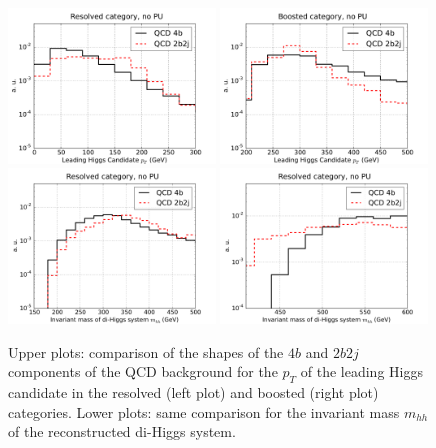 \begin{figure}[t]
\begin{center}
 \includegraphics[width=0.49\textwidth]{plots/pt_h0_C2_res_back_noPU.pdf}
 \includegraphics[width=0.49\textwidth]{plots/pt_h0_C2_bst_back_noPU.pdf}
  \includegraphics[width=0.49\textwidth]{plots/m_hh_C2_res_back_noPU.pdf}
  \includegraphics[width=0.49\textwidth]{plots/m_hh_C2_bst_back_noPU.pdf}
  \caption{\small
    Upper plots: comparison
    of the shapes of the $4b$ and $2b2j$
components of the QCD background for the $p_T$ of the leading
Higgs candidate in the resolved
(left plot) and boosted (right plot) categories.
Lower plots:  same comparison for the invariant
mass $m_{hh}$ of the
    reconstructed di-Higgs system.
}
\label{fig:histoBack}
\end{center}
\end{figure}

